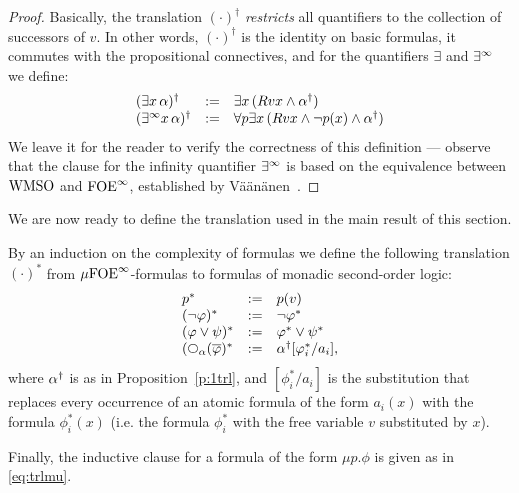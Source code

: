 
\begin{proof}
Basically, the translation $(\cdot)^{\dag}$ \emph{restricts} all quantifiers
to the collection of successors of $v$.
In other words, $(\cdot)^{\dag}$ is the identity on basic formulas, it commutes
with the propositional connectives, and for the quantifiers $\exists$ and $\exists^\infty$
we define:
\[\begin{array}{lll}
(\exists x\, \alpha)^{\dag} &\mathrel{: =}& \exists x\, (Rvx \land \alpha^{\dag})
\\ (\exists^\infty x\, \alpha)^{\dag}  &\mathrel{: =}& \forall p \exists x\, (Rvx \land \neg p(x) 
    \land \alpha^{\dag})
\end{array}\]
We leave it for the reader to verify the correctness of this definition ---
observe that the clause for the infinity quantifier $\exists^\infty$ is based on the 
equivalence between $\mathrm{WMSO}$ and $\mathrm{FOE}^{\infty}$, established by 
V\"a\"an\"anen~\cite{vaananen77}.
\end{proof}

\noindent
We are now ready to define the translation used in the main result of this 
section.

\begin{definition}
By an induction on the complexity of formulas we define the following 
translation $(\cdot)^{*}$ from $\mu\mathrm{FOE}^{\infty}$-formulas to formulas of monadic 
second-order logic:
\[\begin{array}{lll}
   p^{*} &\df& p(v)
\\ (\neg\phi)^{*}        &\df& \neg \phi^{*}
\\ (\phi\lor\psi)^{*}    &\df& \phi^{*} \lor \psi^{*}
\\ (\nxt{\al}(\ol{\phi})^{*} &\df& \al^{\dag}[\phi_{i}^{*}/a_{i}],
\end{array}\]
where $\alpha^{\dag}$ is as in Proposition~\ref{p:1trl}, and $[\phi_{i}^{*}/a_{i}]$
is the substitution that replaces every occurrence of an atomic formula of the 
form $a_{i}(x)$ with the formula $\phi_{i}^{*}(x)$ (i.e. the formula 
$\phi_{i}^{*}$ with the free variable $v$ substituted by $x$).

Finally, the inductive clause for a formula of the form $\mu p.\phi$ is given
as in \eqref{eq:trlmu}.
\end{definition}

